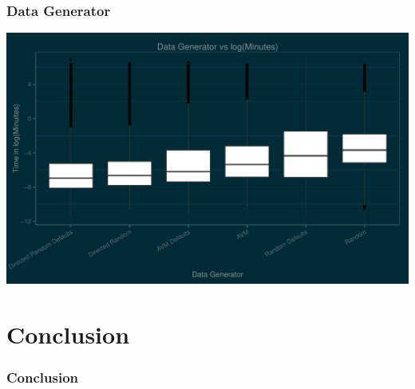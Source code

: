\documentclass[hyperref]{beamer}
\begin{document}
      \begin{frame}
        \frametitle{Data Generator}
        \includegraphics[width=\textwidth]{DataGeneratorBox}
      \end{frame}


    \section{Conclusion}
      \begin{frame}
        \frametitle{Conclusion}
      \end{frame}


      
\end{document}

